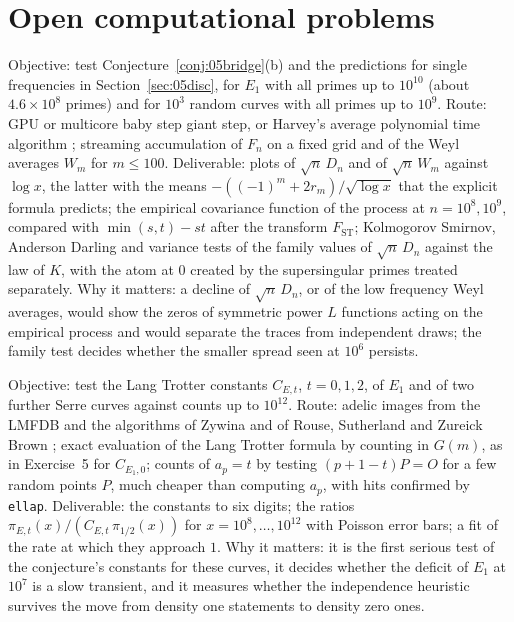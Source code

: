 \section{Open computational problems}

\begin{compproblem}\label{cp:05bridge}
Objective: test Conjecture~\ref{conj:05bridge}(b) and the predictions for single frequencies in Section~\ref{sec:05disc}, for $E_1$ with all primes up to $10^{10}$ (about $4.6\times10^8$ primes) and for $10^3$ random curves with all primes up to $10^9$. Route: GPU or multicore baby step giant step, or Harvey's average polynomial time algorithm \cite{harvey2014}; streaming accumulation of $F_n$ on a fixed grid and of the Weyl averages $W_m$ for $m\le 100$. Deliverable: plots of $\sqrt n\,D_n$ and of $\sqrt n\,W_m$ against $\log x$, the latter with the means $-((-1)^m + 2r_m)/\sqrt{\log x}$ that the explicit formula predicts; the empirical covariance function of the process at $n = 10^8, 10^9$, compared with $\min(s,t) - st$ after the transform $F_{\mathrm{ST}}$; Kolmogorov Smirnov, Anderson Darling and variance tests of the family values of $\sqrt n\,D_n$ against the law of $K$, with the atom at $0$ created by the supersingular primes treated separately. Why it matters: a decline of $\sqrt n\,D_n$, or of the low frequency Weyl averages, would show the zeros of symmetric power $L$ functions acting on the empirical process and would separate the traces from independent draws; the family test decides whether the smaller spread seen at $10^6$ persists.
\end{compproblem}

\begin{compproblem}\label{cp:05lt}
Objective: test the Lang Trotter constants $C_{E,t}$, $t = 0,1,2$, of $E_1$ and of two further Serre curves against counts up to $10^{12}$. Route: adelic images from the LMFDB \cite{lmfdb} and the algorithms of Zywina \cite{zywina2022} and of Rouse, Sutherland and Zureick Brown \cite{rszb2022}; exact evaluation of the Lang Trotter formula by counting in $G(m)$, as in Exercise~5 for $C_{E_1,0}$; counts of $a_p = t$ by testing $(p+1-t)P = O$ for a few random points $P$, much cheaper than computing $a_p$, with hits confirmed by \texttt{ellap}. Deliverable: the constants to six digits; the ratios $\pi_{E,t}(x)/(C_{E,t}\,\pi_{1/2}(x))$ for $x = 10^8,\dots,10^{12}$ with Poisson error bars; a fit of the rate at which they approach $1$. Why it matters: it is the first serious test of the conjecture's constants for these curves, it decides whether the deficit of $E_1$ at $10^7$ is a slow transient, and it measures whether the independence heuristic survives the move from density one statements to density zero ones.
\end{compproblem}

